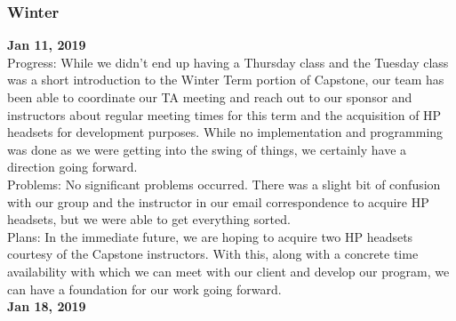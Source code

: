 \subsubsection{Winter}

\textbf{Jan 11, 2019}\\
Progress: 	While we didn't end up having a Thursday class and the Tuesday class was a short introduction to the Winter Term portion of Capstone, our team has been able to coordinate our TA meeting and reach out to our sponsor and instructors about regular meeting times for this term and the acquisition of HP headsets for development purposes. While no implementation and programming was done as we were getting into the swing of things, we certainly have a direction going forward. \\
Problems: 	No significant problems occurred. There was a slight bit of confusion with our group and the instructor in our email correspondence to acquire HP headsets, but we were able to get everything sorted.\\
Plans: 	In the immediate future, we are hoping to acquire two HP headsets courtesy of the Capstone instructors. With this, along with a concrete time availability with which we can meet with our client and develop our program, we can have a foundation for our work going forward. \\
\textbf{Jan 18, 2019}\\

